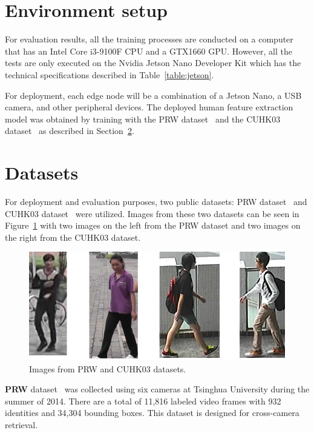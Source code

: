\documentclass[../main.tex]{subfiles}
\begin{document}
\section{Environment setup}
For evaluation results, all the training processes are conducted on a computer that has an Intel Core i3-9100F CPU and a GTX1660 GPU. However, all the tests are only executed on the Nvidia Jetson Nano Developer Kit which has the technical specifications described in Table~\ref{table:jetson}.

For deployment, each edge node will be a combination of a Jetson Nano, a USB camera, and other peripheral devices. The deployed human feature extraction model was obtained by training with the PRW dataset~\cite{zheng2016person} and the CUHK03 dataset~\cite{li2014deepreid} as described in Section~\ref{subsec:dataset}.

\section{Datasets}
\label{subsec:dataset}
For deployment and evaluation purposes, two public datasets: PRW dataset~\cite{zheng2016person} and CUHK03 dataset~\cite{li2014deepreid} were utilized. Images from these two datasets can be seen in Figure~\ref{fig:prw_cuhk03} with two images on the left from the PRW dataset and two images on the right from the CUHK03 dataset.

\begin{figure}[h!]
\centering
\includegraphics[width=\linewidth]{Figure/prw_cuhk03.pdf}
\caption{Images from PRW and CUHK03 datasets.}
\label{fig:prw_cuhk03}
\end{figure}

\textbf{PRW} dataset~\cite{zheng2016person} was collected using six cameras at Tsinghua University during the summer of 2014. There are a total of 11,816 labeled video frames with 932 identities and 34,304 bounding boxes. This dataset is designed for cross-camera retrieval.
\end{document}
